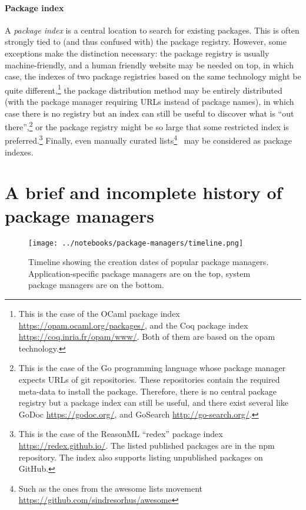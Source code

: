 \paragraph{Package index}

A \emph{package index} is a central location to search for existing packages.
This is often strongly tied to (and thus confused with) the package registry.
However, some exceptions make the distinction necessary: the package registry is usually machine-friendly, and a human friendly website may be needed on top, in which case, the indexes of two package registries based on the same technology might be quite different,\footnote{
	This is the case of the OCaml package index \url{https://opam.ocaml.org/packages/}, and the Coq package index \url{https://coq.inria.fr/opam/www/}.
    Both of them are based on the opam technology.
}  the package distribution method may be entirely distributed (with the package manager requiring URLs instead of package names), in which case there is no registry but an index can still be useful to discover what is ``out there'',\footnote{
	This is the case of the Go programming language whose package manager expects URLs of git repositories.
	These repositories contain the required meta-data to install the package.
	Therefore, there is no central package registry but a package index can still be useful, and there exist several like GoDoc \url{https://godoc.org/}, and GoSearch \url{http://go-search.org/}.
} or the package registry might be so large that some restricted index is preferred.\footnote{
	This is the case of the ReasonML ``redex'' package index \url{https://redex.github.io/}.
	The listed published packages are in the npm repository.
	The index also supports listing unpublished packages on GitHub.
}
Finally, even manually curated lists\footnote{
	Such as the ones from the awesome lists movement
    \url{https://github.com/sindresorhus/awesome}
}~\cite{wu2015rise} may be considered as package indexes.

\section{A brief and incomplete history of package managers}

\begin{figure}
	\begin{center}
		\texttt{[image: ../notebooks/package-managers/timeline.png]}
		\caption{
			Timeline showing the creation dates of popular package managers.
			Application-specific package managers are on the top, system package managers are on the bottom.
		}
		\label{fig:timeline}
	\end{center}
\end{figure}

